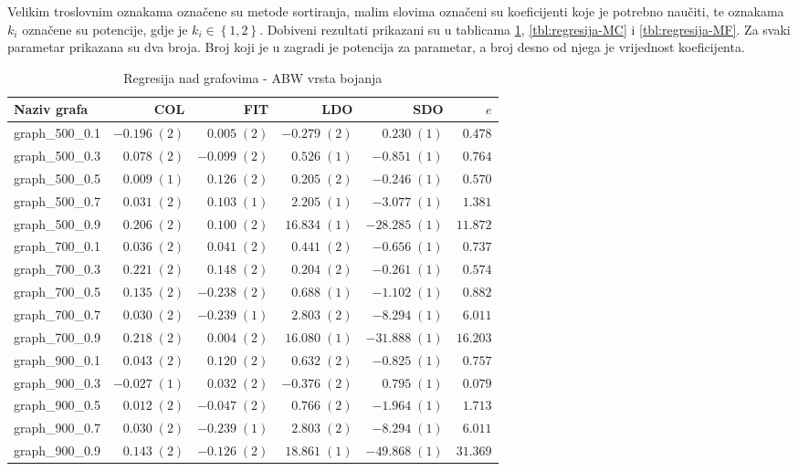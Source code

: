 \documentclass[times, utf8, diplomski, numeric]{fer}
\begin{document}
Velikim troslovnim oznakama označene su metode sortiranja, malim slovima označeni su koeficijenti koje je potrebno naučiti, te oznakama $k_i$ označene su potencije, gdje je $k_i \in \left \{ 1, 2 \right \} $.
Dobiveni rezultati prikazani su u tablicama \ref{tbl:regresija-ABW}, \ref{tbl:regresija-MC} i \ref{tbl:regresija-MF}. Za svaki parametar prikazana su dva broja. Broj koji je u zagradi je potencija za parametar, a broj desno od njega je vrijednost koeficijenta.


\begin{table}[htb]
	\caption{Regresija nad grafovima - ABW vrsta bojanja}
	\label{tbl:regresija-ABW}
	\centering
	\begin{tabular}{|l|r|r|r|r|r|} \hline
	Naziv grafa & COL & FIT & LDO & SDO & $e$ \\ \hline \hline
graph\_500\_0.1 & $ -0.196\; (2) $ & $ 0.005\; (2) $ & $ -0.279\; (2) $ & $ 0.230\; (1) $ & $ 0.478 $\\ \hline
graph\_500\_0.3 & $ 0.078\; (2) $ & $ -0.099\; (2) $ & $ 0.526\; (1) $ & $ -0.851\; (1) $ & $ 0.764 $\\ \hline
graph\_500\_0.5 & $ 0.009\; (1) $ & $ 0.126\; (2) $ & $ 0.205\; (2) $ & $ -0.246\; (1) $ & $ 0.570 $\\ \hline
graph\_500\_0.7 & $ 0.031\; (2) $ & $ 0.103\; (1) $ & $ 2.205\; (1) $ & $ -3.077\; (1) $ & $ 1.381 $\\ \hline
graph\_500\_0.9 & $ 0.206\; (2) $ & $ 0.100\; (2) $ & $ 16.834\; (1) $ & $ -28.285\; (1) $ & $ 11.872 $\\ \hline
graph\_700\_0.1 & $ 0.036\; (2) $ & $ 0.041\; (2) $ & $ 0.441\; (2) $ & $ -0.656\; (1) $ & $ 0.737 $\\ \hline
graph\_700\_0.3 & $ 0.221\; (2) $ & $ 0.148\; (2) $ & $ 0.204\; (2) $ & $ -0.261\; (1) $ & $ 0.574 $\\ \hline
graph\_700\_0.5 & $ 0.135\; (2) $ & $ -0.238\; (2) $ & $ 0.688\; (1) $ & $ -1.102\; (1) $ & $ 0.882 $\\ \hline
graph\_700\_0.7 & $ 0.030\; (2) $ & $ -0.239\; (1) $ & $ 2.803\; (2) $ & $ -8.294\; (1) $ & $ 6.011 $\\ \hline
graph\_700\_0.9 & $ 0.218\; (2) $ & $ 0.004\; (2) $ & $ 16.080\; (1) $ & $ -31.888\; (1) $ & $ 16.203 $\\ \hline
graph\_900\_0.1 & $ 0.043\; (2) $ & $ 0.120\; (2) $ & $ 0.632\; (2) $ & $ -0.825\; (1) $ & $ 0.757 $\\ \hline
graph\_900\_0.3 & $ -0.027\; (1) $ & $ 0.032\; (2) $ & $ -0.376\; (2) $ & $ 0.795\; (1) $ & $ 0.079 $\\ \hline
graph\_900\_0.5 & $ 0.012\; (2) $ & $ -0.047\; (2) $ & $ 0.766\; (2) $ & $ -1.964\; (1) $ & $ 1.713 $\\ \hline
graph\_900\_0.7 & $ 0.030\; (2) $ & $ -0.239\; (1) $ & $ 2.803\; (2) $ & $ -8.294\; (1) $ & $ 6.011 $\\ \hline
graph\_900\_0.9 & $ 0.143\; (2) $ & $ -0.126\; (2) $ & $ 18.861\; (1) $ & $ -49.868\; (1) $ & $ 31.369 $\\ \hline
	\end{tabular}
\end{table} 
\end{document}

